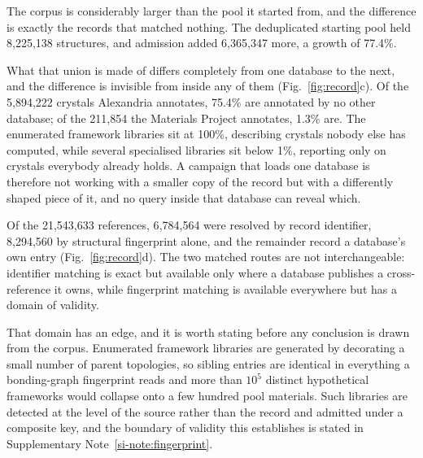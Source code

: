 The corpus is considerably larger than the pool it started from, and the
difference is exactly the records that matched nothing. The deduplicated starting
pool held 8{,}225{,}138 structures, and admission added 6{,}365{,}347 more, a
growth of 77.4\%.

What that union is made of differs completely from one database to the next, and
the difference is invisible from inside any of them
(Fig.~\ref{fig:record}c). Of the 5{,}894{,}222 crystals Alexandria annotates,
75.4\% are annotated by no other database; of the 211{,}854 the Materials Project
annotates, 1.3\% are. The enumerated framework libraries sit at 100\%,
describing crystals nobody else has computed, while several specialised libraries
sit below 1\%, reporting only on crystals everybody already holds. A campaign
that loads one database is therefore not working with a smaller copy of the
record but with a differently shaped piece of it, and no query inside that
database can reveal which.

Of the
21{,}543{,}633 references, 6{,}784{,}564 were resolved by record identifier,
8{,}294{,}560 by structural fingerprint alone, and the remainder record a
database's own entry (Fig.~\ref{fig:record}d). The two matched routes are
not interchangeable: identifier matching is exact but available only where a
database publishes a cross-reference it owns, while fingerprint matching is
available everywhere but has a domain of validity.

That domain has an edge, and it is worth stating before any conclusion is drawn
from the corpus. Enumerated framework libraries are generated by decorating a
small number of parent topologies, so sibling entries are identical in everything
a bonding-graph fingerprint reads and more than $10^5$ distinct hypothetical
frameworks would collapse onto a few hundred pool materials. Such libraries are
detected at the level of the source rather than the record and admitted under a
composite key, and the boundary of validity this establishes is stated in
Supplementary Note~\ref{si-note:fingerprint}.

